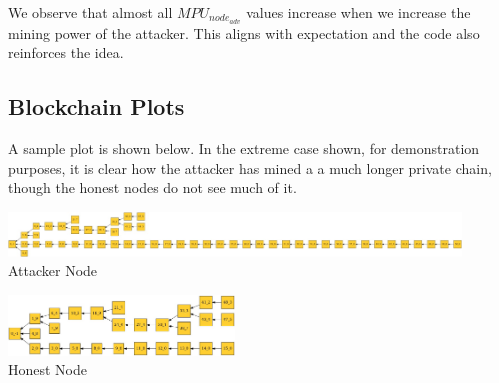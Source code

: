 \documentclass[a4paper,14pt]{article}
\begin{document}
We observe that almost all $MPU_{node_{adv}}$ values increase when we increase the mining power of the attacker. This aligns with expectation and the code also reinforces the idea.

\subsection{Blockchain Plots}

A sample plot is shown below. In the extreme case shown, for demonstration purposes, it is clear how the attacker has mined a a much longer private chain, though the honest nodes do not see much of it.

\begin{center}
    \includegraphics[width=12cm]{attacker.jpeg}\\
    Attacker Node
\end{center}


\begin{center}
    \includegraphics[width=6cm]{normal.jpeg}\\
    Honest Node
\end{center}
\end{document}
